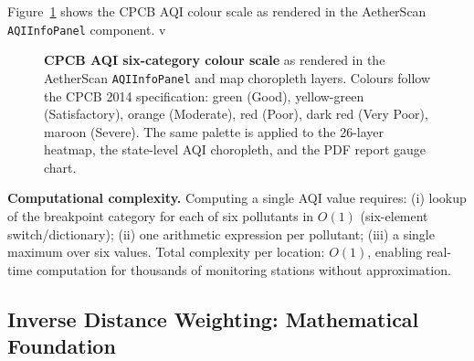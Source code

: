 \documentclass[12pt,a4paper]{article}
\begin{document}
Figure~\ref{fig:aqicolors} shows the CPCB AQI colour scale as rendered in
the AetherScan \texttt{AQIInfoPanel} component.
v
\begin{figure}[H]
\centering
{}
\caption[CPCB AQI colour scale as used in AetherScan UI]{%
  \textbf{CPCB AQI six-category colour scale} as rendered in the
  AetherScan \texttt{AQIInfoPanel} and map choropleth layers.
  Colours follow the CPCB 2014 specification: green (Good),
  yellow-green (Satisfactory), orange (Moderate), red (Poor),
  dark red (Very Poor), maroon (Severe). The same palette is
  applied to the 26-layer heatmap, the state-level AQI choropleth,
  and the PDF report gauge chart.}
\label{fig:aqicolors}
\end{figure}

\noindent\textbf{Computational complexity.}
Computing a single AQI value requires: (i) lookup of the breakpoint category
for each of six pollutants in $O(1)$ (six-element switch/dictionary); (ii)
one arithmetic expression per pollutant; (iii) a single maximum over six values.
Total complexity per location: $O(1)$, enabling real-time computation for
thousands of monitoring stations without approximation.

\subsection{Inverse Distance Weighting: Mathematical Foundation}
\label{sec:background:idw}
\end{document}
